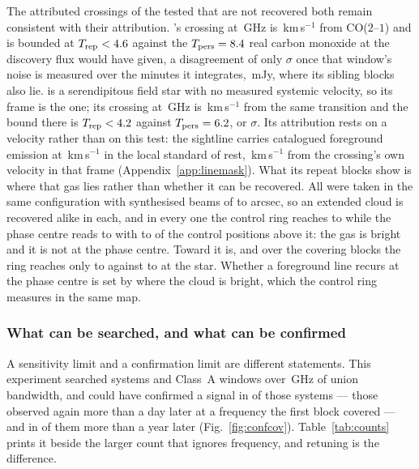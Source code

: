 The \MkAttrExcl{} attributed crossings of the \MkAttrTested{} tested that are
not recovered both remain consistent with their attribution. \RqHrStar's
crossing at \RqHrFreq\,GHz is \RqHrDv\,km\,s$^{-1}$ from CO($2$--$1$) and is
bounded at $T_{\rm rep}<4.6$ against the $T_{\rm pers}=8.4$ real
carbon monoxide at the discovery flux would have given, a disagreement of only
\RqHrExcl$\sigma$ once that window's noise is measured over the
\RqHrOnsMin{} minutes it integrates, \RqHrRms\,mJy, where its sibling blocks
also lie. \RqAjStar{} is a
serendipitous field star with no measured systemic velocity, so its frame is
the \RqAjFrame{} one; its crossing at \RqAjFreq\,GHz is \RqAjDv\,km\,s$^{-1}$
from the same transition and the bound there is $T_{\rm rep}<4.2$
against $T_{\rm pers}=6.2$, or \RqAjExcl$\sigma$. Its attribution rests
on a velocity rather than on this test: the sightline carries catalogued
foreground emission at \LsLupVco\,km\,s$^{-1}$ in the local standard of rest,
\LsLupDv\,km\,s$^{-1}$ from the crossing's own velocity in that frame
(Appendix~\ref{app:linemask}). What its repeat blocks show is where that gas
lies rather than whether it can be recovered. All \RqAjNRep{} were taken in
the same \RqAjArray{} configuration with synthesised beams of \RqAjBeamLo{} to
\RqAjBeamHi{} arcsec, so an extended cloud is recovered alike in each, and in
every one the control ring reaches \RqAjCtrlLo{} to \RqAjCtrlHi{} while the
phase centre reads \RqAjStarLo{} to \RqAjStarHi{} with \RqAjNgeLo{} to
\RqAjNgeHi{} of the \NCtrl{} control positions above it: the gas is bright and
it is not at the phase centre. Toward \RqRecurCloudStars{} it is, and over the
\RqCtlNBlock{} covering blocks the ring reaches only \RqCtlRingLo{} to
\RqCtlRingHi{} against \RqCtlStarLo{} to \RqCtlStarHi{} at the star.
Whether a foreground line recurs at the phase centre is set by where the cloud
is bright, which the control ring measures in the same map.

\subsubsection{What can be searched, and what can be confirmed}
\label{sec:confirmability}

A sensitivity limit and a confirmation limit are different statements. This
experiment searched \RcSearchSys{} systems and \RcSearchWin{} Class~A windows
over \CvUnionA\,GHz of union bandwidth, and could have confirmed a signal in
\RcConfSysDay{} of those systems --- those observed again more than a day
later at a frequency the first block covered --- and in \RcConfSysYr{} of
them more than a year later (Fig.~\ref{fig:confcov}).
Table~\ref{tab:counts} prints it beside the larger count that ignores
frequency, and retuning is the difference.

